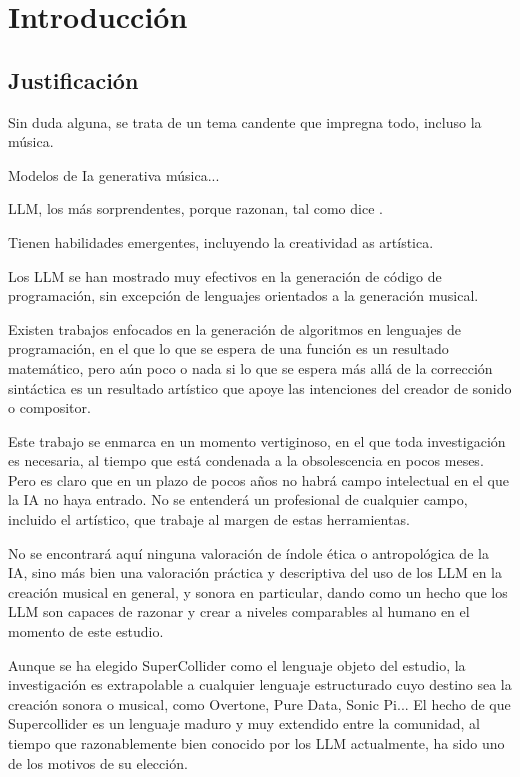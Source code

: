 \chapter{Introducción}
\section{Justificación}

Sin duda alguna, se trata de un tema candente que impregna todo, incluso la música.

Modelos de Ia generativa música...

LLM, los más sorprendentes, porque razonan, tal como dice \cite{chenTeachingLargeLanguage2023}.

Tienen habilidades emergentes, incluyendo la creatividad as artística.

Los LLM se han mostrado muy efectivos en la generación de código de programación, sin excepción de lenguajes orientados a la generación musical. 

Existen trabajos enfocados en la generación de algoritmos en lenguajes de programación, en el que lo que se espera de una función es un resultado matemático, pero aún poco o nada si lo que se espera más allá de la corrección sintáctica es un resultado artístico que apoye las intenciones del creador de sonido o compositor.

Este trabajo se enmarca en un momento vertiginoso, en el que toda investigación es necesaria, al tiempo que está condenada a la obsolescencia en pocos meses. Pero es claro que en un plazo de pocos años no habrá campo intelectual en el que la IA no haya entrado. No se entenderá un profesional de cualquier campo, incluido el artístico, que trabaje al margen de estas herramientas.

No se encontrará aquí ninguna valoración de índole ética o antropológica de la IA, sino más bien una valoración práctica y descriptiva del uso de los LLM en la creación musical en general, y sonora en particular, dando como un hecho que los LLM son capaces de razonar y crear a niveles comparables al humano en el momento de este estudio.

Aunque se ha elegido SuperCollider como el lenguaje objeto del estudio, la investigación es extrapolable a cualquier lenguaje estructurado cuyo destino sea la creación sonora o musical, como Overtone, Pure Data, Sonic Pi... El hecho de que Supercollider es un lenguaje maduro y muy extendido entre la comunidad, al tiempo que razonablemente bien conocido por los LLM actualmente, ha sido uno de los motivos de su elección.

